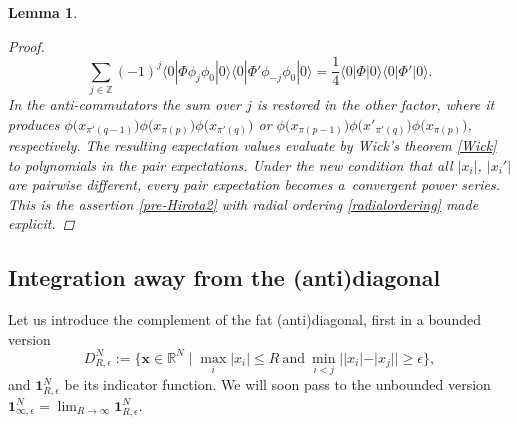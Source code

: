 \documentclass[10pt,a4paper]{amsart}
\numberwithin{equation}{section}
\newtheorem{Lemma}[Theorem]{Lemma}
\begin{document}
\begin{Lemma}
\begin{proof}
\[
\sum_{j\in \mathbb{Z}} (-1)^j\langle 0|\Phi \phi_j\phi_0|0\rangle
\langle 0|\Phi' \phi_{-j}\phi_0|0\rangle =\frac{1}{4}
\langle 0|\Phi|0\rangle\langle 0|\Phi'|0\rangle.
\]
In the anti-commutators the sum over $j$ is restored in the other factor,
where it produces
$\phi\bigl(x_{\pi'(q-1)}\bigr) \phi\bigl(x_{\pi(p)}\bigr)\phi\bigl(x_{\pi'(q)}\bigr)$
or $\phi\bigl(x_{\pi(p-1)}\bigr) \phi\bigl(x'_{\pi'(q)}\bigr)\phi\bigl(x_{\pi(p)}\bigr)$, respectively.
The resulting expectation values evaluate by
Wick's theorem \eqref{Wick} to polynomials in the pair
expectations. Under the new condition
that all $|x_i|$, $|x_i'|$ are pairwise different, every
pair expectation becomes a~convergent power series.
This is the assertion \eqref{pre-Hirota2}
with radial ordering \eqref{radialordering} made
explicit.
\end{proof}
\end{Lemma}

\subsection{Integration away from the (anti)diagonal}

Let us introduce the complement of the fat (anti)diagonal, first in a bounded version
\[
D^N_{R,\epsilon}:=\bigl\{\boldsymbol{x} \in \mathbb{R}^{N} \mid
\max_i |x_i| \leq R \ \text{and} \ \min_{i < j} ||x_i|-|x_j||\geq \epsilon\bigr\},
\]
and $\mathbf{1}^{N}_{R,\epsilon}$ be its indicator function. We will soon pass to the unbounded version $\mathbf{1}^N_{\infty,\epsilon}
=\lim_{R\to \infty} \mathbf{1}^N_{R,\epsilon}$.
\end{document}
